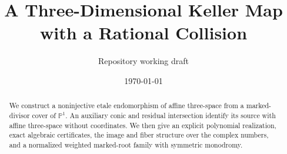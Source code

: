 \documentclass[11pt]{article}
\title{A Three-Dimensional Keller Map with a Rational Collision}
\author{Repository working draft}
\date{\today}
\begin{document}
\maketitle

\begin{abstract}
We construct a noninjective etale endomorphism of affine three-space from a
marked-divisor cover of $\mathbb P^1$.  An auxiliary conic and residual
intersection identify its source with affine three-space without coordinates.
We then give an explicit polynomial realization, exact algebraic
certificates, the image and fiber structure over the complex numbers, and a
normalized weighted marked-root family with symmetric monodromy.
\end{abstract}

\tableofcontents












\appendix




\end{document}
